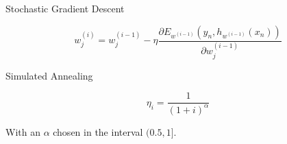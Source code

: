\begin{frame}{Stochastic Gradient Descent}

\[ w_j^{(i)} = w_j^{(i-1)} - \eta \frac{\partial E_{w^{(i-1)}}(y_n, h_{w^{(i-1)}}(x_n))}{\partial w_j^{(i-1)}} \]

\end{frame}


\begin{frame}{Simulated Annealing}

$$\eta_i = \frac{1}{(1+i)^\alpha}$$


With an $\alpha$ chosen in the interval $(0.5,1]$. 

\end{frame}


